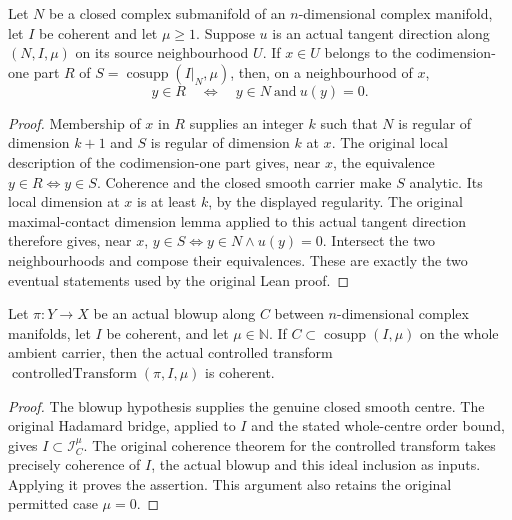 \begin{lemma}
\label{pub:codim-one-contact-local-equation}
\leanok
Let $N$ be a closed complex submanifold of an $n$-dimensional complex manifold,
let $I$ be coherent and let $\mu\ge1$. Suppose $u$ is an actual tangent direction
along $(N,I,\mu)$ on its source neighbourhood $U$. If $x\in U$ belongs to the
codimension-one part $R$ of $S=\operatorname{cosupp}(I|_N,\mu)$, then, on a
neighbourhood of $x$,
\[
       y\in R\quad\Longleftrightarrow\quad y\in N\ \text{and}\ u(y)=0.
\]
\end{lemma}
\begin{proof}
Membership of $x$ in $R$ supplies an integer $k$ such that $N$ is regular of
dimension $k+1$ and $S$ is regular of dimension $k$ at $x$. The original local
description of the codimension-one part gives, near $x$, the equivalence
$y\in R\Longleftrightarrow y\in S$.
Coherence and the closed smooth carrier make $S$ analytic. Its local dimension
at $x$ is at least $k$, by the displayed regularity. The original
maximal-contact dimension lemma applied to this actual tangent direction
therefore gives, near $x$, $y\in S\Longleftrightarrow y\in N\land u(y)=0$.
Intersect the two neighbourhoods and compose their equivalences. These are
exactly the two eventual statements used by the original Lean proof.
\end{proof}

\begin{lemma}
\label{pub:hadamard-controlled-transform-coherent}
\leanok
Let $\pi:Y\to X$ be an actual blowup along $C$ between $n$-dimensional complex
manifolds, let $I$ be coherent, and let $\mu\in\mathbb N$. If
$C\subset\operatorname{cosupp}(I,\mu)$ on the whole ambient carrier, then the
actual controlled transform $\operatorname{controlledTransform}(\pi,I,\mu)$
is coherent.
\end{lemma}
\begin{proof}
The blowup hypothesis supplies the genuine closed smooth centre. The original
Hadamard bridge, applied to $I$ and the stated whole-centre order bound, gives
$I\subset\mathcal I_C^\mu$. The original coherence theorem for the controlled
transform takes precisely coherence of $I$, the actual blowup and this ideal
inclusion as inputs. Applying it proves the assertion. This argument also
retains the original permitted case $\mu=0$.
\end{proof}

